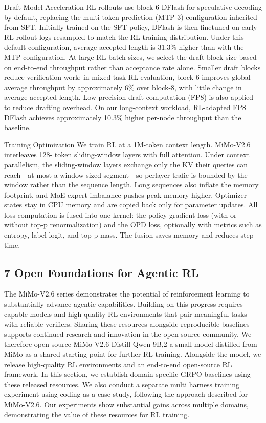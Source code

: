 \documentclass[
  10
]{article}
\begin{document}
Draft Model Acceleration RL rollouts use block-6 DFlash for speculative
decoding by default, replacing the multi-token prediction (MTP-3)
configuration inherited from SFT. Initially trained on the SFT policy,
DFlash is then finetuned on early RL rollout logs resampled to match the
RL training distribution. Under this default configuration, average
accepted length is 31.3\% higher than with the MTP configuration. At
large RL batch sizes, we select the draft block size based on end-to-end
throughput rather than acceptance rate alone. Smaller draft blocks
reduce verification work: in mixed-task RL evaluation, block-6 improves
global average throughput by approximately 6\% over block-8, with little
change in average accepted length. Low-precision draft computation (FP8)
is also applied to reduce drafting overhead. On our long-context
workload, RL-adapted FP8 DFlash achieves approximately 10.3\% higher
per-node throughput than the baseline.

Training Optimization We train RL at a 1M-token context length.
MiMo-V2.6 interleaves 128- token sliding-window layers with full
attention. Under context parallelism, the sliding-window layers exchange
only the KV their queries can reach---at most a window-sized
segment---so perlayer trafic is bounded by the window rather than the
sequence length. Long sequences also inflate the memory footprint, and
MoE expert imbalance pushes peak memory higher. Optimizer states stay in
CPU memory and are copied back only for parameter updates. All loss
computation is fused into one kernel: the policy-gradient loss (with or
without top-p renormalization) and the OPD loss, optionally with metrics
such as entropy, label logit, and top-p mass. The fusion saves memory
and reduces step time.

\subsection{7 Open Foundations for Agentic
RL}\label{open-foundations-for-agentic-rl}

The MiMo-V2.6 series demonstrates the potential of reinforcement
learning to substantially advance agentic capabilities. Building on this
progress requires capable models and high-quality RL environments that
pair meaningful tasks with reliable verifiers. Sharing these resources
alongside reproducible baselines supports continued research and
innovation in the open-source community. We therefore open-source
MiMo-V2.6-Distill-Qwen-9B,2 a small model distilled from MiMo as a
shared starting point for further RL training. Alongside the model, we
release high-quality RL environments and an end-to-end open-source RL
framework. In this section, we establish domain-specific GRPO baselines
using these released resources. We also conduct a separate multi harness
training experiment using coding as a case study, following the approach
described for MiMo-V2.6. Our experiments show substantial gains across
multiple domains, demonstrating the value of these resources for RL
training.
\end{document}
